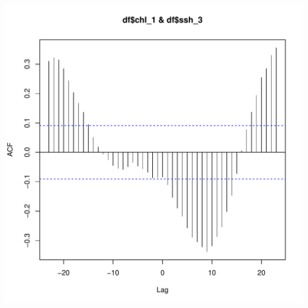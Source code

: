 \documentclass{article}\usepackage[]{graphicx}\usepackage[]{color}
\makeatletter
\def\maxwidth{ %
  \ifdim\Gin@nat@width>\linewidth
    \linewidth
  \else
    \Gin@nat@width
  \fi
}
\newenvironment{knitrout}{}{} %
\makeatother
\begin{document}
\begin{knitrout}
\includegraphics[width=\maxwidth]{figure/unnamed-chunk-13-2} 

\end{knitrout}
\end{document}
